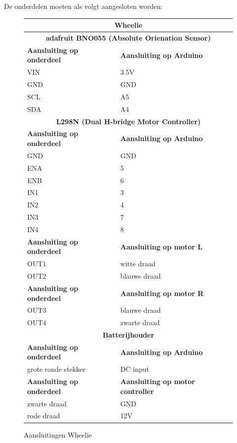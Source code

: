 \documentclass[12pt,a4paper]{article}
\begin{document}
De onderdelen moeten als volgt aangesloten worden:
\begin{figure} [H]
	\begin{tabularx}{\textwidth}{|X|X|}	
		\hline \multicolumn{2}{|c|}{\textbf{Wheelie}}	\\	
		\hline \multicolumn{2}{|c|}{\textbf{adafruit BNO055 (Absolute Orienation Sensor)}}	\\	
		\hline \textbf{Aansluiting op onderdeel} & \textbf{Aansluiting op Arduino} \\ 
		\hline VIN & 3.5V \\ 
		\hline GND & GND\\ 
		\hline SCL & A5 \\  
		\hline SDA & A4 \\
		\hline \multicolumn{2}{|c|}{\textbf{L298N (Dual H-bridge Motor Controller)}}	\\	 
		\hline \textbf{Aansluiting op onderdeel} & \textbf{Aansluiting op Arduino} \\
		\hline GND & GND \\
		\hline ENA & 5  \\
		\hline ENB & 6 \\
		\hline IN1 & 3 \\
		\hline IN2 & 4 \\
		\hline IN3 & 7 \\
		\hline IN4 & 8 \\
		\hline \textbf{Aansluiting op onderdeel} & \textbf{Aansluiting op motor L} \\
		\hline OUT1 & witte draad \\
		\hline OUT2 & blauwe draad \\
		\hline \textbf{Aansluiting op onderdeel} & \textbf{Aansluiting op motor R} \\
		\hline OUT3 & blauwe draad \\
		\hline OUT4 & zwarte draad \\
		\hline \multicolumn{2}{|c|}{\textbf{Batterijhouder}}\\	 
		\hline \textbf{Aansluiting op onderdeel} & \textbf{Aansluiting op Arduino} \\
		\hline grote ronde stekker & DC input \\
		\hline \textbf{Aansluiting op onderdeel} & \textbf{Aansluiting op motor controller} \\
		\hline zwarte draad & GND \\
		\hline rode draad & 12V \\		
		\hline		
	\end{tabularx} 
	\caption{Aansluitingen Wheelie}
	\label{tbl:Aansluitingen_Wheelie}
\end{figure}
\end{document}
